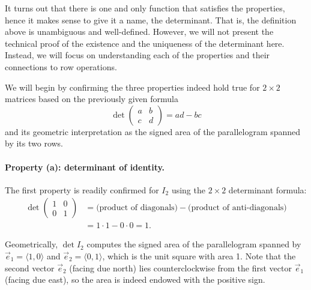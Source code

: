 \documentclass{ximera}
\begin{document}
It turns out that there is one and only function that satisfies the
properties, hence it makes sense to give it a name, the
determinant. That is, the definition above is unambiguous and
well-defined. However, we will not present the technical proof of the
existence and the uniqueness of the determinant here. Instead, we will
focus on understanding each of the properties and their connections to
row operations.

We will begin by confirming the three properties indeed hold true for
$2 \times 2$ matrices based on the previously given formula
\[
  \det
  \begin{pmatrix}
    a & b \\ c & d
  \end{pmatrix}
  = ad - bc
\]
and its geometric interpretation as the signed area of the
parallelogram spanned by its two rows.

\paragraph{Property (a): determinant of identity.}
The first property is readily confirmed for $I_2$ using the
$2 \times 2$ determinant formula:
\begin{align*}
  \det
  \begin{pmatrix}
    1 & 0 \\ 0 & 1
  \end{pmatrix}
  & = \text{(product of diagonals)} - \text{(product of
    anti-diagonals)} \\
      & = 1 \cdot 1 - 0 \cdot 0 = 1.
\end{align*}

Geometrically, $\det I_2$ computes the signed area of the
parallelogram spanned by $\vec{e}_1 = \langle 1, 0 \rangle$ and
$\vec{e}_2 = \langle 0, 1 \rangle$, which is the unit square with area
1. Note that the second vector $\vec{e}_2$ (facing due
north) lies counterclockwise from the first vector
$\vec{e}_1$ (facing due east), so the area is indeed
endowed with the positive sign.
\end{document}
